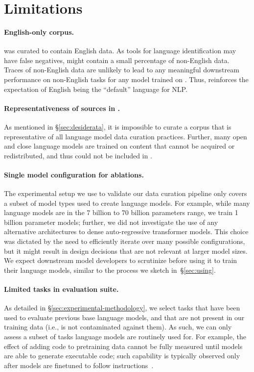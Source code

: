 \section*{Limitations}
\label{sec:limitations}


\paragraph{English-only corpus.} 
\dolma was curated to contain English data. 
As tools for language identification may have false negatives, \dolma might contain a small percentage of non-English data.
Traces of non-English data are unlikely to lead to any meaningful downstream performance on non-English tasks for any model trained on \dolma. 
Thus, \dolma reinforces the expectation of English being the ``default'' language for NLP. 

\paragraph{Representativeness of sources in \dolma.} 
As mentioned in \S\ref{sec:desiderata}, it is impossible to curate a corpus that is representative of all language model data curation practices. 
Further, many open and close language models are trained on content that cannot be acquired or redistributed, and thus could not be included in \dolma. 

\paragraph{Single model configuration for ablations.} 
The experimental setup we use to validate our data curation pipeline only covers a subset of model types used to create language models. 
For example, while many language models are in the 7 billion to 70 billion parameters range, we train 1 billion parameter models;
further, we did not investigate the use of any alternative architectures to dense auto-regressive transformer models.
This choice was dictated by the need to efficiently iterate over many possible configurations, but it might result in design decisions that are not relevant at larger model sizes.
We expect downstream model developers to scrutinize \dolma before using it to train their language models, similar to the process we sketch in~\S\ref{sec:using}.

\paragraph{Limited tasks in evaluation suite.}
As detailed in \S\ref{sec:experimental-methodology}, we select tasks that have been used to evaluate previous base language models, and that are not present in our training data (i.e., \dolma is not contaminated against them). 
As such, we can only assess a subset of tasks language models are routinely used for. 
For example, the effect of adding code to pretraining data cannot be fully measured until models are able to generate executable code; such capability is typically observed only after models are finetuned to follow instructions~\citep{muennighoff2023octopack,zhuo2024astraios}.  


